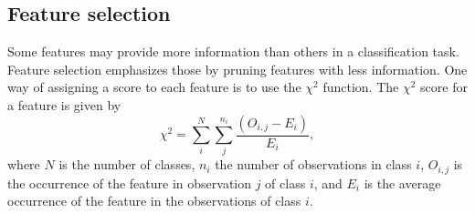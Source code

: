 \subsection{Feature selection}
Some features may provide more information than others in a classification task. Feature selection emphasizes those by pruning features with less information. One way of assigning a score to each feature is to use the $\chi^2$ function. The $\chi^2$ score for a feature is given by
\[
\chi^2 = \sum_i^N \sum_j^{n_i} \frac{\left ( O_{i,j} - E_i \right )}{E_i},
\]
where $N$ is the number of classes, $n_i$ the number of observations in class $i$, $O_{i,j}$ is the occurrence of the feature in observation $j$ of class $i$, and $E_i$ is the average occurrence of the feature in the observations of class $i$. 